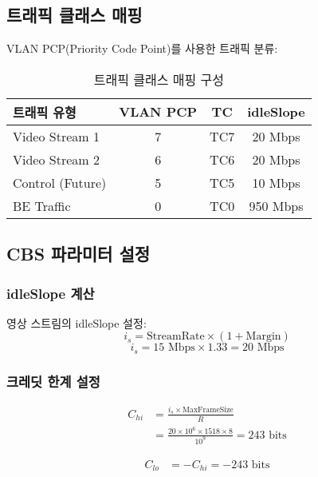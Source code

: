\documentclass[10pt,twocolumn]{IEEEtran}
\begin{document}
\subsection{트래픽 클래스 매핑}

VLAN PCP(Priority Code Point)를 사용한 트래픽 분류:

\begin{table}[h]
\centering
\caption{트래픽 클래스 매핑 구성}
\begin{tabular}{lccc}
\toprule
\textbf{트래픽 유형} & \textbf{VLAN PCP} & \textbf{TC} & \textbf{idleSlope} \\
\midrule
Video Stream 1 & 7 & TC7 & 20 Mbps \\
Video Stream 2 & 6 & TC6 & 20 Mbps \\
Control (Future) & 5 & TC5 & 10 Mbps \\
BE Traffic & 0 & TC0 & 950 Mbps \\
\bottomrule
\end{tabular}
\end{table}

\subsection{CBS 파라미터 설정}

\subsubsection{idleSlope 계산}
영상 스트림의 idleSlope 설정:
\begin{equation}
i_s = \text{StreamRate} \times (1 + \text{Margin})
\end{equation}
\begin{equation}
i_s = 15 \text{ Mbps} \times 1.33 = 20 \text{ Mbps}
\end{equation}

\subsubsection{크레딧 한계 설정}
\begin{align}
C_{hi} &= \frac{i_s \times \text{MaxFrameSize}}{R} \\
&= \frac{20 \times 10^6 \times 1518 \times 8}{10^9} = 243 \text{ bits}
\end{align}

\begin{align}
C_{lo} &= -C_{hi} = -243 \text{ bits}
\end{align}
\end{document}
